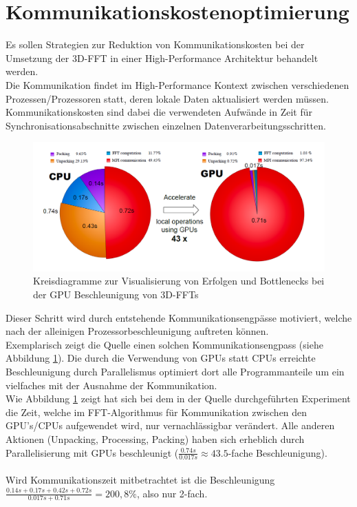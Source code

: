 \section{Kommunikationskostenoptimierung}
Es sollen Strategien zur Reduktion von Kommunikationskosten bei der Umsetzung der 3D-FFT in einer High-Performance Architektur behandelt werden.\\

Die Kommunikation findet im High-Performance Kontext zwischen verschiedenen Prozessen/Prozessoren statt, deren lokale Daten aktualisiert werden müssen.\\
Kommunikationskosten sind dabei die verwendeten Aufwände in Zeit für Synchronisationsabschnitte zwischen einzelnen Datenverarbeitungsschritten.\\

\begin{figure}
\centering
  \includegraphics[width=\linewidth]{res/speedup.png}
  \caption{\cite[Abb. 3]{mainpaper} Kreisdiagramme zur Visualisierung von Erfolgen und Bottlenecks bei der GPU Beschleunigung von 3D-FFTs}
  \label{fig:speedup}
\end{figure}

Dieser Schritt wird durch entstehende Kommunikationsengpässe motiviert, welche nach der alleinigen Prozessorbeschleunigung auftreten können.\\
Exemplarisch zeigt die Quelle \cite[Abb. 3]{mainpaper} einen solchen Kommunikationsengpass (siehe Abbildung \ref{fig:speedup}).
Die durch die Verwendung von GPUs statt CPUs erreichte Beschleunigung durch Parallelismus optimiert dort alle Programmanteile um ein vielfaches mit der Ausnahme der Kommunikation.\\

Wie Abbildung \ref{fig:speedup} zeigt hat sich bei dem in der Quelle durchgeführten Experiment die Zeit, welche im FFT-Algorithmus für Kommunikation zwischen den GPU's/CPUs aufgewendet wird, nur vernachlässigbar verändert. Alle anderen Aktionen (Unpacking, Processing, Packing) haben sich erheblich durch Parallelisierung mit GPUs beschleunigt ($ \frac{0.74s}{0.017s} \approx 43.5$-fache Beschleunigung).\\
\\
Wird Kommunikationszeit mitbetrachtet ist die Beschleunigung $\frac{0.14s+0.17s+0.42s+0.72s}{0.017s+0.71s}=200,8\%$, also nur 2-fach.

